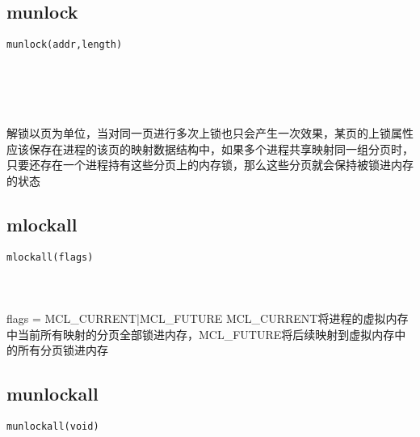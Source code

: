 \documentclass[10pt,a4paper]{article}
\begin{document}
\subsection{munlock}
\begin{spacing}{2.0}
\lstset{language=C,numbers=none}
\begin{lstlisting}
munlock(addr,length)
\end{lstlisting}
{\large\color[rgb]{0.2,0.4,0.6}{addr:}} \\
{\large\color[rgb]{0.2,0.4,0.6}{length:}}
\paragraph{ \ \ }解锁以页为单位，当对同一页进行多次上锁也只会产生一次效果，某页的上锁属性应该保存在进程的该页的映射数据结构中，如果多个进程共享映射同一组分页时，只要还存在一个进程持有这些分页上的内存锁，那么这些分页就会保持被锁进内存的状态
\end{spacing}

\subsection{mlockall}
\begin{spacing}{2.0}
\lstset{language=C,numbers=none}
\begin{lstlisting}
mlockall(flags)
\end{lstlisting}
{\large\color[rgb]{0.2,0.4,0.6}{flags:}}
\paragraph{ \ \ }flags = MCL\_CURRENT|MCL\_FUTURE MCL\_CURRENT将进程的虚拟内存中当前所有映射的分页全部锁进内存，MCL\_FUTURE将后续映射到虚拟内存中的所有分页锁进内存
\end{spacing}

\subsection{munlockall}
\begin{spacing}{2.0}
\lstset{language=C,numbers=none}
\begin{lstlisting}
munlockall(void)
\end{lstlisting}
{\large\color[rgb]{0.2,0.4,0.6}{void:}}
\paragraph{ \ \ }
\end{spacing}
\end{document}
